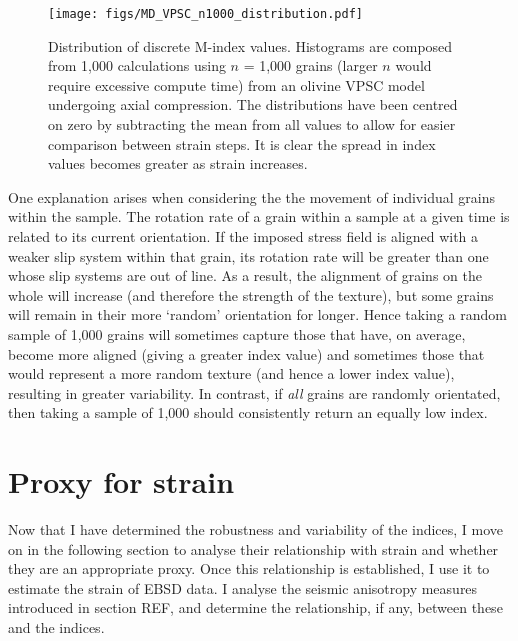\documentclass[a4paper,12pt]{report}
\numberwithin{equation}{chapter}
\begin{document}
\begin{figure}[h]
  \centering
    \texttt{[image: figs/MD\_VPSC\_n1000\_distribution.pdf]}
  \caption[Discrete M-index distribution (olivine VPSC)]{Distribution of discrete M-index values. Histograms are composed from 1,000 calculations using $n$ = 1,000 grains (larger $n$ would require excessive compute time) from an olivine VPSC model undergoing axial compression. The distributions have been centred on zero by subtracting the mean from all values to allow for easier comparison between strain steps. It is clear the spread in index values becomes greater as strain increases.}
  \label{fig:VPSC_md_dist}
\end{figure} 

One explanation arises when considering the the movement of individual grains within the sample. The rotation rate of a grain within a sample at a given time is related to its current orientation. If the imposed stress field is aligned with a weaker slip system within that grain, its rotation rate will be greater than one whose slip systems are out of line. As a result, the alignment of grains on the whole will increase (and therefore the strength of the texture), but some grains will remain in their more \lq{}random\rq{} orientation for longer. Hence taking a random sample of 1,000 grains will sometimes capture those that have, on average, become more aligned (giving a greater index value) and sometimes those that would represent a more random texture (and hence a lower index value), resulting in greater variability. In contrast, if \emph{all} grains are randomly orientated, then taking a sample of 1,000 should consistently return an equally low index.     


\section{Proxy for strain}

Now that I have determined the robustness and variability of the indices, I move on in the following section to analyse their relationship with strain and whether they are an appropriate proxy. Once this relationship is established, I use it to estimate the strain of EBSD data. I analyse the seismic anisotropy measures introduced in section REF, and determine the relationship, if any, between these and the indices.   
\end{document}
